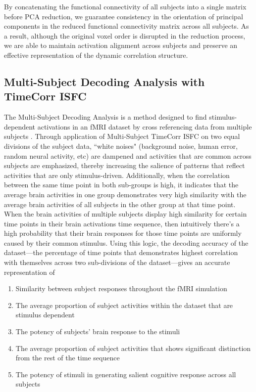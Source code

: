 \documentclass[11pt]{article}
\begin{document}
By concatenating the functional connectivity of all subjects into a single matrix before PCA reduction, we guarantee consistency in the orientation of principal components in the reduced functional connectivity matrix across all subjects. As a result, although the original voxel order is disrupted in the reduction process, we are able to maintain activation alignment across subjects and preserve an effective representation of the dynamic correlation structure.

\subsection{Multi-Subject Decoding Analysis with TimeCorr ISFC}
The Multi-Subject Decoding Analysis is a method designed to find stimulus-dependent activations in an fMRI dataset by cross referencing data from multiple subjects \cite{jeremy2017}. Through application of Multi-Subject TimeCorr ISFC on two equal divisions of the subject data, ``white noises" (background noise, human error, random neural activity, etc) are dampened and activities that are common across subjects are emphasized, thereby increasing the salience of patterns that reflect activities that are only stimulus-driven. Additionally, when the correlation between the same time point in both sub-groups is high, it indicates that the average brain activities in one group demonstrates very high similarity with the average brain activities of all subjects in the other group at that time point. When the brain activities of multiple subjects display high similarity for certain time points in their brain activations time sequence, then intuitively there's a high probability that their brain responses for those time points are uniformly caused by their common stimulus. Using this logic, the decoding accuracy of the dataset---the percentage of time points that demonstrates highest correlation with themselves across two sub-divisions of the dataset---gives an accurate representation of

\begin{enumerate}
\item Similarity between subject responses throughout the fMRI simulation
\item The average proportion of subject activities within the dataset that are stimulus dependent
\item The potency of subjects' brain response to the stimuli
\item The average proportion of subject activities that shows significant distinction from the rest of the time sequence
\item The potency of stimuli in generating salient cognitive response across all subjects
\end{enumerate}
\end{document}
